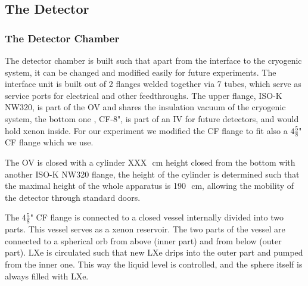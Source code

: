 \subsection{The Detector}
\label{subsec:det}
 


\subsubsection{The Detector Chamber}
\label{subsubsec:detchamber}

The detector chamber is built such that apart from the interface to the cryogenic system, it can be changed and modified easily for future experiments.
The interface unit is built out of 2 flanges welded together via 7 tubes, which serve as service ports for electrical and other feedthroughs. 
The upper flange, ISO-K NW320, is part of the OV and shares the insulation vacuum of the cryogenic system, the bottom one , CF-8", is 
part of an IV for future detectors, and would hold xenon inside. For our experiment we modified the CF flange to fit also a $4\frac{5}{8}$" CF 
flange which we use.

The OV is closed with a cylinder XXX~\,cm height closed from the bottom with another ISO-K NW320 flange, the height of the cylinder is determined 
such that the maximal height of the whole apparatus is 190~\,cm, allowing the mobility of the detector through standard doors.
 
The $4\frac{5}{8}$" CF flange is connected to a closed vessel internally divided into two parts. This vessel serves as a xenon reservoir. 
The two parts of the vessel are connected to a spherical orb from above (inner part) and from below (outer part). LXe is circulated such that new LXe drips into 
the outer part and pumped from the inner one. This way the liquid level is controlled, and the sphere itself is always filled with LXe. 



